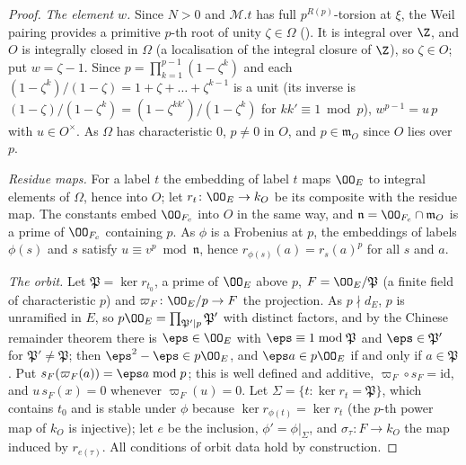 \begin{proof}
\emph{The element $w$.} Since $N>0$ and $\mathcal M.t$ has full $p^{R(p)}$-torsion at $\xi$, the Weil pairing provides a
primitive $p$-th root of unity $\zeta\in\Omega$ (). It is
integral over $\Z$, and $O$ is integrally closed in $\Omega$ (a localisation of the integral closure of $\Z$), so $\zeta\in O$;
put $w=\zeta-1$. Since $p=\prod_{k=1}^{p-1}(1-\zeta^k)$ and each $(1-\zeta^k)/(1-\zeta)=1+\zeta+\dots+\zeta^{k-1}$ is a unit
(its inverse is $(1-\zeta)/(1-\zeta^k)=(1-\zeta^{kk'})/(1-\zeta^k)$ for $kk'\equiv1\bmod p$), $w^{p-1}=u\,p$ with $u\in O^\times$.
As $\Omega$ has characteristic $0$, $p\ne0$ in $O$, and $p\in\mathfrak m_O$ since $O$ lies over $p$.

\emph{Residue maps.} For a label $t$ the embedding of label $t$ maps $\OO_E$ to integral elements of $\Omega$, hence into $O$;
let $r_t\colon\OO_E\to k_O$ be its composite with the residue map. The constants embed $\OO_{F_c}$ into $O$ in the same way, and
$\mathfrak n=\OO_{F_c}\cap\mathfrak m_O$ is a prime of $\OO_{F_c}$ containing $p$. As $\phi$ is a Frobenius at $p$, the
embeddings of labels $\phi(s)$ and $s$ satisfy $u\equiv v^p\bmod\mathfrak n$, hence $r_{\phi(s)}(a)=r_s(a)^p$ for all $s$ and $a$.

\emph{The orbit.} Let $\mathfrak P=\ker r_{t_0}$, a prime of $\OO_E$ above $p$, $F=\OO_E/\mathfrak P$ (a finite field of
characteristic $p$) and $\varpi_F\colon\OO_E/p\to F$ the projection. As $p\nmid d_E$, $p$ is unramified in $E$, so
$p\OO_E=\prod_{\mathfrak P'\mid p}\mathfrak P'$ with distinct factors, and by the Chinese remainder theorem there is
$\eps\in\OO_E$ with $\eps\equiv1\bmod\mathfrak P$ and $\eps\in\mathfrak P'$ for $\mathfrak P'\ne\mathfrak P$; then
$\eps^2-\eps\in p\OO_E$, and $\eps a\in p\OO_E$ if and only if $a\in\mathfrak P$. Put $s_F(\varpi_F(a))=\eps a\bmod p$; this is
well defined and additive, $\varpi_F\circ s_F=\mathrm{id}$, and $u\,s_F(x)=0$ whenever $\varpi_F(u)=0$. Let
$\Sigma=\{t:\ker r_t=\mathfrak P\}$, which contains $t_0$ and is stable under $\phi$ because $\ker r_{\phi(t)}=\ker r_t$ (the
$p$-th power map of $k_O$ is injective); let $e$ be the inclusion, $\phi'=\phi|_\Sigma$, and $\sigma_\tau\colon F\to k_O$ the map
induced by $r_{e(\tau)}$. All conditions of orbit data hold by construction.
\end{proof}

